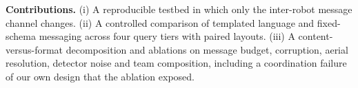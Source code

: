 \textbf{Contributions.} (i) A reproducible testbed in which only the inter-robot message channel changes. (ii) A controlled comparison of templated language and fixed-schema messaging across four query tiers with paired layouts. (iii) A content-versus-format decomposition and ablations on message budget, corruption, aerial resolution, detector noise and team composition, including a coordination failure of our own design that the ablation exposed.
